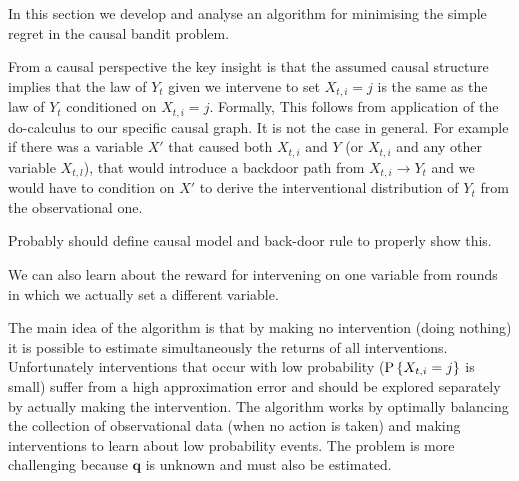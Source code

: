 In this section we develop and analyse an algorithm for minimising the simple regret in the
causal bandit problem.  

From a causal perspective the key insight is that the assumed causal structure implies that
the law of $Y_t$ given we intervene to set $X_{t,i} = j$ is the same as the law of $Y_t$ conditioned
on $X_{t,i} = j$. Formally,
This follows from application of the do-calculus \cite{Pearl2000} to our specific causal graph. It is not the case in general. 
For example if there was a variable $X'$ that caused both $X_{t,i}$ and $Y$ (or $X_{t,i}$ and any other variable $X_{t,l}$), 
that would introduce a backdoor path from $X_{t,i} \rightarrow Y_t$ and we would have to condition on $X'$ to derive the 
interventional distribution of $Y_t$ from the observational one.

\color{red} Probably should define causal model and back-door rule to properly show this.\color{black}

We can also learn about the reward for intervening on one variable from rounds in which we actually set a different variable.



The main idea of the algorithm is that by making no intervention (doing nothing) it is possible to estimate simultaneously the returns of all interventions.
Unfortunately interventions that occur with low probability ($\P{X_{t,i} = j}$ is small) suffer from a high approximation error and should be
explored separately by actually making the intervention. The algorithm works by optimally balancing the collection of observational data (when
no action is taken) and making interventions to learn about low probability events. The problem is more challenging because $\boldsymbol{q}$ is
unknown and must also be estimated.

